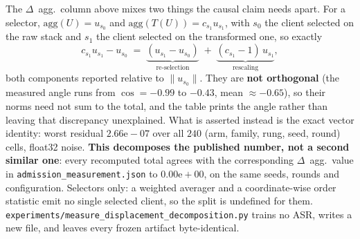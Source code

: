 \documentclass{article}
\begin{document}
\noindent The $\Delta$~agg.\ column above mixes two things the causal claim needs apart. For a selector, $\mathrm{agg}(U) = u_{s_0}$ and $\mathrm{agg}(T(U)) = c_{s_1} u_{s_1}$, with $s_0$ the client selected on the raw stack and $s_1$ the client selected on the transformed one, so exactly
\[ c_{s_1}u_{s_1} - u_{s_0} \;=\; \underbrace{(u_{s_1} - u_{s_0})}_{\text{re-selection}} \;+\; \underbrace{(c_{s_1}-1)\,u_{s_1}}_{\text{rescaling}}, \]
both components reported relative to $\|u_{s_0}\|$. They are \textbf{not orthogonal} (the measured angle runs from $\cos{=}{-}0.99$ to $-0.43$, mean $\approx-0.65$), so their norms need not sum to the total, and the table prints the angle rather than leaving that discrepancy unexplained. What is asserted instead is the exact vector identity: worst residual $2.66\mathrm{e}{-}07$ over all $240$ (arm, family, rung, seed, round) cells, float32 noise. \textbf{This decomposes the published number, not a second similar one}: every recomputed total agrees with the corresponding $\Delta$~agg.\ value in \texttt{admission\_measurement.json} to $0.00\mathrm{e}{+}00$, on the same seeds, rounds and configuration. Selectors only: a weighted averager and a coordinate-wise order statistic emit no single selected client, so the split is undefined for them. \texttt{experiments/measure\_displacement\_decomposition.py} trains no ASR, writes a new file, and leaves every frozen artifact byte-identical.
\end{document}
